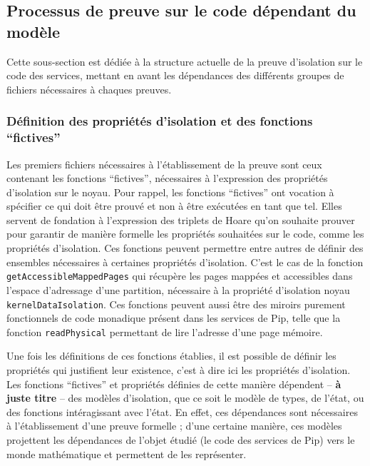 		\subsection{Processus de preuve sur le code dépendant du modèle}
		\label{sec:dependant_code}

			Cette sous-section est dédiée à la structure actuelle de la preuve d'isolation sur le code des services, mettant en avant les dépendances des différents groupes de fichiers nécessaires à chaques preuves.

			\subsubsection{Définition des propriétés d'isolation et des fonctions ``fictives''}

			Les premiers fichiers nécessaires à l'établissement de la preuve sont ceux contenant les fonctions ``fictives'', nécessaires à l'expression des propriétés d'isolation sur le noyau. Pour rappel, les fonctions ``fictives'' ont vocation à spécifier ce qui doit être prouvé et non à être exécutées en tant que tel. Elles servent de fondation à l'expression des triplets de Hoare qu'on souhaite prouver pour garantir de manière formelle les propriétés souhaitées sur le code, comme les propriétés d'isolation. Ces fonctions peuvent permettre entre autres de définir des ensembles nécessaires à certaines propriétés d'isolation. C'est le cas de la fonction \texttt{getAccessibleMappedPages} qui récupère les pages mappées et accessibles dans l'espace d'adressage d'une partition, nécessaire à la propriété d'isolation noyau \texttt{kernelDataIsolation}. Ces fonctions peuvent aussi être des miroirs purement fonctionnels de code monadique présent dans les services de Pip, telle que la fonction \texttt{readPhysical} permettant de lire l'adresse d'une page mémoire. 

			Une fois les définitions de ces fonctions établies, il est possible de définir les propriétés qui justifient leur existence, c'est à dire ici les propriétés d'isolation. Les fonctions ``fictives'' et propriétés définies de cette manière dépendent -- \textbf{à juste titre} -- des modèles d'isolation, que ce soit le modèle de types, de l'état, ou des fonctions intéragissant avec l'état. En effet, ces dépendances sont nécessaires à l'établissement d'une preuve formelle ; d'une certaine manière, ces modèles projettent les dépendances de l'objet étudié (le code des services de Pip) vers le monde mathématique et permettent de les représenter. 

